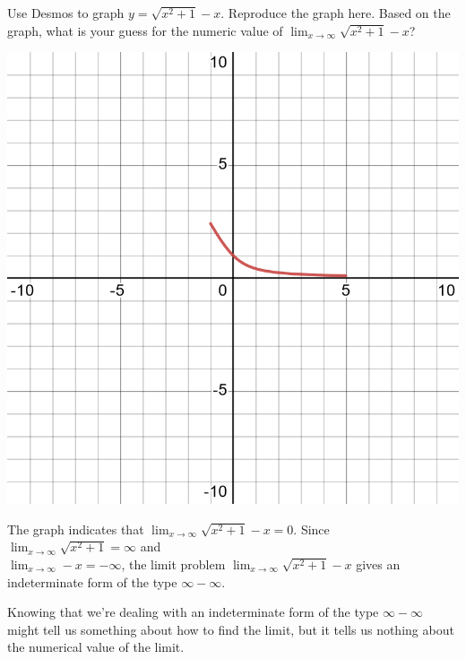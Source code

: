 \documentclass[12pt,fleqn,answers]{exam}
\begin{document}
\begin{questions} 
    
  \question [2] Use Desmos to graph $y = \sqrt{x^2+1} - x$. Reproduce
  the graph here.  Based on the graph, what is your guess for 
  the numeric value of $\displaystyle \lim_{x \to \infty} \sqrt{x^2+1} - x$?


 
  \begin{solution}[2.5in]
  \vfill
 
    \begin{center}
        \includegraphics[scale=0.2]{desmos-graph(20).png}
    \end{center}
    The graph indicates that $\displaystyle \lim_{x \to \infty} \sqrt{x^2+1} - x = 0$. Since $\displaystyle \lim_{x \to \infty} \sqrt{x^2+1} = \infty$
  and \\ \mbox{$\displaystyle \lim_{x \to \infty}  - x = -\infty$}, the limit problem $\displaystyle \lim_{x \to \infty} \sqrt{x^2+1} - x$ gives
an indeterminate form of the type $\infty - \infty$.  

\quad  Knowing that we're dealing with an  indeterminate form of the type $\infty - \infty$ might
tell us something about how to find the limit, but it tells us nothing about the numerical value of the limit.
     \end{solution}


\end{questions}
\end{document}
